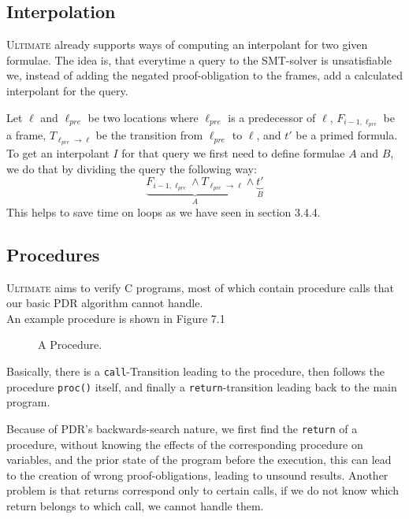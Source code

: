 \documentclass[11pt, a4paper, BCOR=10mm, ngerman]{scrbook}
\begin{document}
\subsection{Interpolation}
\textsc{Ultimate} already supports ways of computing an interpolant for two given formulae. The idea is, that everytime a query to the SMT-solver is unsatisfiable we, instead of adding the negated proof-obligation to the frames, add a calculated interpolant for the query. \par
Let $\ell$ and $\ell_{pre}$ be two locations where $\ell_{pre}$ is a predecessor of $\ell$, $F_{i - 1, \ell_{pre}}$ be a frame, $T_{\ell_{pre} \rightarrow \ell}$ be the transition from $\ell_{pre}$ to $\ell$, and $t'$ be a primed formula. \\
To get an interpolant $I$ for that query we first need to define formulae $A$ and $B$, we do that by dividing the query the following way:
\begin{equation*}
\underbrace{F_{i - 1, \ell_{pre}} \land T_{\ell_{pre} \rightarrow \ell}}_{A} \land \underbrace{t'}_B
\end{equation*}
This helps to save time on loops as we have seen in section 3.4.4.
\subsection{Procedures}
\textsc{Ultimate} aims to verify C programs, most of which contain procedure calls that our basic PDR algorithm  cannot handle. \\ An example procedure is shown in Figure 7.1

\begin{figure}[H]
\centering
{}
  \caption{A Procedure.}
 \end{figure}
 \label{procedure Ex}  

Basically, there is a \texttt{call}-Transition leading to the procedure, then follows the procedure \texttt{proc()} itself, and finally a \texttt{return}-transition leading back to the main program. \par
Because of PDR's backwards-search nature, we first find the \texttt{return} of a procedure, without knowing the effects of the corresponding procedure on variables, and the prior state of the program before the execution, this can lead to the creation of wrong proof-obligations, leading to unsound results. Another problem is that returns correspond only to certain calls, if we do not know which return belongs to which call, we cannot handle them. \par
\end{document}
